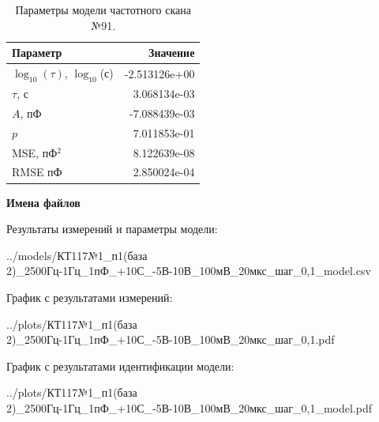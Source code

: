 \begin{table}[!ht]
    \centering
    \caption{Параметры модели частотного скана №91.}
    \begin{tabular}{|l|r|}
        \hline
        Параметр                                       & Значение                  \\ \hline
        $\log_{10}(\tau)$, $\log_{10}$(с)              & -2.513126e+00             \\ \hline
        $\tau$, с                                      & 3.068134e-03              \\ \hline
        $A$, пФ                                        & -7.088439e-03             \\ \hline
        $p$                                            & 7.011853e-01              \\ \hline
        MSE, пФ$^2$                                    & 8.122639e-08              \\ \hline
        RMSE пФ                                        & 2.850024e-04              \\ \hline
    \end{tabular}
    \label{table:frequency_scan_model_91}
\end{table}

\textbf{Имена файлов}

Результаты измерений и параметры модели:

\scriptsize../models/КТ117№1\_п1(база 2)\_2500Гц-1Гц\_1пФ\_+10С\_-5В-10В\_100мВ\_20мкс\_шаг\_0,1\_model.csv
\normalsize

График с результатами измерений:

\scriptsize../plots/КТ117№1\_п1(база 2)\_2500Гц-1Гц\_1пФ\_+10С\_-5В-10В\_100мВ\_20мкс\_шаг\_0,1.pdf
\normalsize

График с результатами идентификации модели:

\scriptsize../plots/КТ117№1\_п1(база 2)\_2500Гц-1Гц\_1пФ\_+10С\_-5В-10В\_100мВ\_20мкс\_шаг\_0,1\_model.pdf
\normalsize

